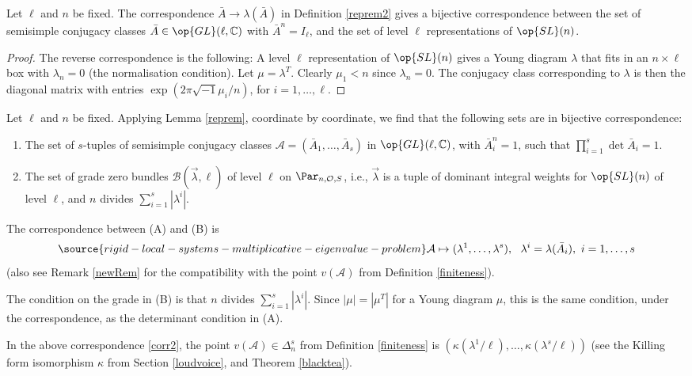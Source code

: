 \begin{lemma}
\notready\label{reprem}Let $\ell$ and $n$ be fixed. The correspondence $\bar{A}\to \lambda(\bar{A})$ in Definition \ref{reprem2} gives a bijective correspondence between the  set of semisimple conjugacy classes  $\bar{A}\in\op{GL}(\ell,\Bbb{C})$ with $\bar{A}^n=I_{\ell}$,  and the set of  level $\ell$ representations of $\op{SL}(n)$.
\end{lemma}
\begin{proof}
The reverse correspondence is the following: A  level $\ell$ representation of $\op{SL}(n)$
gives a Young diagram  $\lambda$ that fits in an $n\times \ell$ box with $\lambda_n=0$ (the  normalisation condition).   Let $\mu=\lambda^T$.  Clearly $\mu_1<n$ since $\lambda_n=0$. The conjugacy class corresponding to $\lambda$ is then the diagonal matrix with entries $\exp(2\pi\sqrt{-1}\mu_i/n)$, for $i=1,\dots,\ell$.
\end{proof}


Let $\ell$ and $n$ be fixed. Applying Lemma \ref{reprem}, coordinate by coordinate, we find that the following sets are in bijective correspondence:
\begin{enumerate}
\item[(A)]The set of $s$-tuples of semisimple  conjugacy classes $\mathcal{A}=(\bar{A}_1,\dots,\bar{A}_s)$ in $\op{GL}(\ell,\Bbb{C})$, with $\bar{A}_i^n=1$, such that  $\prod_{i=1}^s \det \bar{A}_i =1$.
\item[(B)] The set of grade zero bundles $\mathcal{B}(\vec{\lambda},\ell)$  of level $\ell$ on $\Par_{n,\mathcal{O},S}$, i.e., $\vec{\lambda}$ is a tuple of  dominant integral weights  for $\op{SL}(n)$ of level $\ell$, and  $n$ divides $\sum_{i=1}^s|\lambda^i|$.
\end{enumerate}
The correspondence between (A) and (B) is
\begin{equation}\label{corr2}
\source{rigid-local-systems-multiplicative-eigenvalue-problem}
\mathcal{A}\mapsto (\lambda^1,\dots,\lambda^s),\ \ \lambda^i=\lambda(\bar{A}_i), \ i=1,\dots,s
\end{equation}
(also see Remark \ref{newRem} for the compatibility with the point $v(\mathcal{A})$ from Definition \ref{finiteness}).

The condition on  the grade in  (B) is that $n$ divides $\sum_{i=1}^s|\lambda^i|$. Since $|\mu|=|\mu^T|$ for a Young diagram $\mu$, this is the same condition, under the correspondence, as the determinant condition in (A).
\begin{remark}
\notready\label{newRem}
In the above correspondence \eqref{corr2}, the point $v(\mathcal{A})\in \Delta_n^s$ from Definition \ref{finiteness} is
$(\kappa(\lambda^1/\ell),\dots,\kappa(\lambda^s/\ell))$ (see the Killing form isomorphism $\kappa$ from Section \ref{loudvoice}, and Theorem \ref{blacktea}).

\end{remark}

